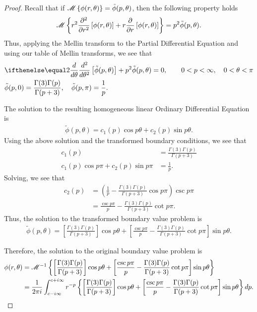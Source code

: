 \begin{proof}
  Recall that if $\mathscr{M}\left\{ {\phi(r, \theta)} \right\} = \tilde{\phi}(p, \theta)$, then the following property holds
  \begin{align*}
    \mathscr{M}\left\{ {r^2 \frac{\partial^2}{\partial r^2}\left[\phi(r, \theta)\right] + r \frac{\partial}{\partial r}\left[\phi(r, \theta) \right]} \right\} = p^2 \tilde{\phi}(p, \theta).
  \end{align*}
  Thus, applying the Mellin transform to the Partial Differential Equation and using our table of Mellin transforms,
  we see that
  \begin{align*}
    &\der{\theta}{2}\left[\tilde{\phi}(p, \theta)\right] + p^2 \tilde{\phi}(p, \theta) = 0, \qquad 0 < p < \infty, \quad 0 < \theta < \pi \\
    &\tilde{\phi}(p, 0) = \frac{\Gamma(3)\Gamma(p)}{\Gamma(p + 3)},\quad \tilde{\phi}(p, \pi) = \frac{1}{p}.
  \end{align*}

  The solution to the resulting homogeneous linear Ordinary Differential Equation is
  \begin{align*}
    \tilde{\phi}(p, \theta) = c_1(p) \cos p\theta + c_2(p) \sin p\theta.
  \end{align*}
  Using the above solution and the transformed boundary conditions, we see that
  \begin{align*}
    c_1(p) &= \frac{\Gamma(3)\Gamma(p)}{\Gamma(p + 3)} \\
    c_1(p)\cos p\pi + c_2(p)\sin p \pi &= \frac{1}{p}.
  \end{align*}
  Solving, we see that
  \begin{align*}
    c_2(p) &= \left(\frac{1}{p} - \frac{\Gamma(3)\Gamma(p)}{\Gamma(p + 3)} \cos p\pi\right) \csc p\pi \\
    &= \frac{\csc p\pi}{p} - \frac{\Gamma(3)\Gamma(p)}{\Gamma(p + 3)} \cot p\pi.
  \end{align*}
  Thus, the solution to the transformed boundary value problem is
  \begin{align*}
    \tilde{\phi}(p, \theta) = \left[\frac{\Gamma(3)\Gamma(p)}{\Gamma(p + 3)}\right] \cos p\theta + \left[\frac{\csc p\pi}{p} - \frac{\Gamma(3)\Gamma(p)}{\Gamma(p + 3)} \cot p\pi\right] \sin p\theta.
  \end{align*}

  Therefore, the solution to the original boundary value problem is
  \begin{align*}
    \phi(r, \theta) &= \mathscr{M}^{-1}\left\{ {\left[\frac{\Gamma(3)\Gamma(p)}{\Gamma(p + 3)}\right] \cos p\theta + \left[\frac{\csc p\pi}{p} - \frac{\Gamma(3)\Gamma(p)}{\Gamma(p + 3)} \cot p\pi\right] \sin p\theta} \right\} \\
    &= \frac{1}{2\pi i} \int_{c - i \infty}^{c + i \infty} r^{-p} \left\{\left[\frac{\Gamma(3)\Gamma(p)}{\Gamma(p + 3)}\right] \cos p\theta + \left[\frac{\csc p\pi}{p} - \frac{\Gamma(3)\Gamma(p)}{\Gamma(p + 3)} \cot p\pi\right] \sin p\theta\right\}dp.
  \end{align*}
\end{proof}
\newpage
